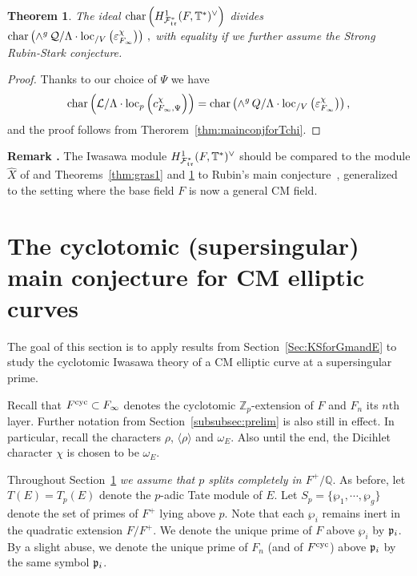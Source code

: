 \documentclass[12pt]{amsart}
\numberwithin{equation}{section}
\newtheorem{thm}{Theorem}[section]
\newenvironment{rem}{\par\medskip\noindent\refstepcounter{thm}
\bgroup{\hspace*{-0.15 cm}\bf{Remark} \thethm.}\bgroup}{\egroup
\egroup\par\medskip} \parskip 2pt
\begin{document}
\begin{thm}
\label{thm:mainconjdivisibility}
The ideal $\textup{char}\left(H^1_{{\mathcal{F}}^*_{\frak{tr}}}(F,{\mathbb{T}}^*)^\vee\right) $ divides $\textup{char} \left(\wedge^g \,\mathcal{Q}/{\Lambda}\cdot  {\textup{loc}_{/V}}\left(\varepsilon_{F_\infty}^\chi \right)\right)\,,$ with equality if we further assume the Strong Rubin-Stark conjecture.

\end{thm}
\begin{proof}
Thanks to our choice of $\Psi$ we have
$$\textup{char} \left(\frak{\mathcal{L}}/{\Lambda}\cdot  \textup{loc}_p\left(c_{F_\infty,\Psi}^\chi \right)\right)=\textup{char} \left(\wedge^g\, Q/{\Lambda}\cdot  {\textup{loc}_{/V}}\left(\varepsilon_{F_\infty}^\chi \right)\right),$$
and the proof follows from Therorem~\ref{thm:mainconjforTchi}. \end{proof}
\begin{rem}
\label{rem:comparetoRubin}
The Iwasawa module $H^1_{{\mathcal{F}}^*_{\frak{tr}}}(F,{\mathbb{T}}^*)^\vee$ should be compared to the module $\hat{X}$ of \cite[\S11]{rubinmainconj} and  Theorems~\ref{thm:gras1} and \ref{thm:mainconjdivisibility} to Rubin's main conjecture~\cite[Theorem 4.1(ii)]{rubinmainconj}, generalized to the setting where the base field $F$ is now a general CM field.
\end{rem}
\section{The cyclotomic (supersingular) main conjecture for CM elliptic curves}
\label{subsec:cyclomain}
The goal of this section is to apply results from Section~\ref{Sec:KSforGmandE} to study the cyclotomic Iwasawa theory of a CM elliptic curve at a supersingular prime.

Recall that $F^{\textup{cyc}}\subset F_\infty$ denotes the cyclotomic ${\mathbb{Z}}_p$-extension of $F$ and $F_n$ its $n$th layer. Further notation from Section~\ref{subsubsec:prelim} is also still in effect. In particular, recall the characters $\rho$, $\langle \rho\rangle$ and $\omega_E$. Also until the end, the Dicihlet character $\chi$ is chosen to be $\omega_E$.

Throughout Section~\ref{subsec:cyclomain} \emph{we assume that $p$ splits completely in $F^+/{\mathbb{Q}}$}. As before, let $T(E)=T_p(E)$ denote the $p$-adic Tate module of $E$. Let $S_p=\{\wp_1,\cdots,\wp_g\}$ denote the set of primes of $F^+$ lying above $p$. Note that each $\wp_i$ remains inert in the quadratic extension $F/F^+$. We denote the unique prime of $F$ above $\wp_i$ by $\frak{p}_i$. By a slight abuse, we denote the unique prime of $F_n$ (and of $F^{\textup{cyc}}$) above $\frak{p}_i$ by the same symbol $\frak{p}_i$.
\end{document}
